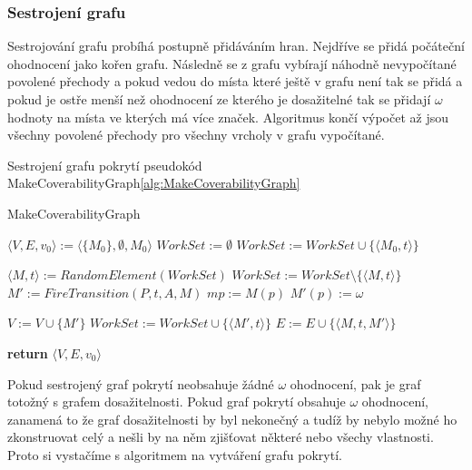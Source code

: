 \documentclass[
  biblatex,
  glossaries,
  index
]{kidiplom}
\begin{document}
\subsubsection{Sestrojení grafu}

Sestrojování grafu probíhá postupně přidáváním hran. Nejdříve se přidá počáteční 
ohodnocení jako kořen grafu. Následně se z grafu vybírají náhodně
nevypočítané povolené přechody a pokud vedou do místa které ještě 
v grafu není tak se přidá a pokud je ostře menší než ohodnocení ze kterého
je dosažitelné tak se přidají $\omega$ hodnoty na místa ve kterých má více značek.
Algoritmus končí výpočet až jsou všechny povolené 
přechody pro všechny vrcholy v grafu vypočítané.

\begin{center}
  Sestrojení grafu pokrytí pseudokód MakeCoverabilityGraph\ref{alg:MakeCoverabilityGraph}
\end{center}

\begin{algorithm}
  \caption{MakeCoverabilityGraph}\label{alg:MakeCoverabilityGraph}
  \begin{algorithmic}[1]
    \State $\langle V,E,v_0\rangle := \langle\{M_0\},\emptyset,M_0\rangle$
    \State $WorkSet := \emptyset $
    \State $WorkSet := WorkSet \cup \{\langle M_0, t \rangle\} $
    \EndFor

    \State $\langle M, t \rangle := RandomElement(WorkSet)$
    \State $WorkSet := WorkSet \setminus \{\langle M, t \rangle\}$
    \State $M' := FireTransition(P,t,A,M)$
    \State $mp := M(p)$
    \State $M'(p) := \omega$
    \EndIf
    \EndFor
    \EndFor

    \State $V := V \cup \{M'\}$
    \State $WorkSet := WorkSet \cup \{\langle M', t \rangle\} $
    \EndFor
    \EndIf
    \State $E := E \cup \{\langle M,t,M'\rangle\}$
    \EndWhile

    \State \textbf{return} $\langle V,E,v_0\rangle$
    \EndFunction
  \end{algorithmic}
\end{algorithm}

Pokud sestrojený graf pokrytí neobsahuje žádné $\omega$ ohodnocení,
pak je graf totožný s grafem dosažitelnosti. 
Pokud graf pokrytí obsahuje $\omega$ ohodnocení, zanamená to že 
graf dosažitelnosti by byl nekonečný a tudíž by nebylo možné 
ho zkonstruovat celý a nešli by na něm zjišťovat některé nebo všechy vlastnosti.
Proto si vystačíme s algoritmem na vytváření grafu pokrytí.
\end{document}
